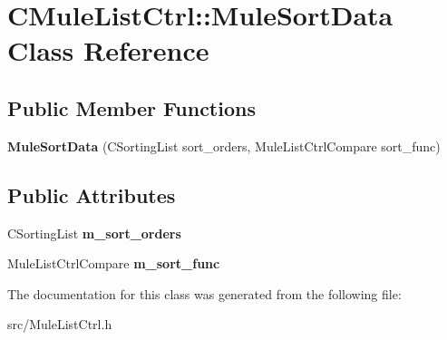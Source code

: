 \section{CMuleListCtrl::MuleSortData Class Reference}
\label{classCMuleListCtrl_1_1MuleSortData}
\subsection*{Public Member Functions}
\begin{DoxyCompactItemize}
\item 
{\bfseries MuleSortData} (CSortingList sort\_\-orders, MuleListCtrlCompare sort\_\-func)\label{classCMuleListCtrl_1_1MuleSortData_a7a3d76ed9c159effac013c150b049960}

\end{DoxyCompactItemize}
\subsection*{Public Attributes}
\begin{DoxyCompactItemize}
\item 
CSortingList {\bfseries m\_\-sort\_\-orders}\label{classCMuleListCtrl_1_1MuleSortData_a4a17d664d0717f4f1fbc60903cb090dc}

\item 
MuleListCtrlCompare {\bfseries m\_\-sort\_\-func}\label{classCMuleListCtrl_1_1MuleSortData_a86c8062a31b37e7c1a984c5726a1cdd2}

\end{DoxyCompactItemize}


The documentation for this class was generated from the following file:\begin{DoxyCompactItemize}
\item 
src/MuleListCtrl.h\end{DoxyCompactItemize}
